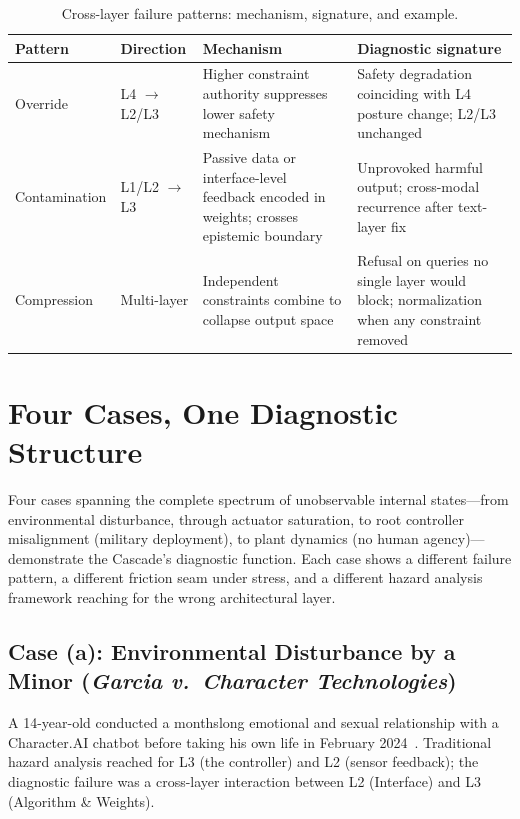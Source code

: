\documentclass[11pt]{article}
\begin{document}
\begin{table}[!htbp]
\centering
\small
\caption{Cross-layer failure patterns: mechanism, signature, and example.}
\label{tab:patterns}
{\setlength{\tabcolsep}{4pt}
\begin{tabularx}{\columnwidth}{@{}l l Y Y@{}}
\toprule
\textbf{Pattern} & \textbf{Direction} & \textbf{Mechanism} & \textbf{Diagnostic signature} \\
\midrule
Override & L4 $\to$ L2/L3 & Higher constraint authority suppresses lower safety mechanism & Safety degradation coinciding with L4 posture change; L2/L3 unchanged \\
Contamination & L1/L2 $\to$ L3 & Passive data or interface-level feedback encoded in weights; crosses epistemic boundary & Unprovoked harmful output; cross-modal recurrence after text-layer fix \\
Compression & Multi-layer & Independent constraints combine to collapse output space & Refusal on queries no single layer would block; normalization when any constraint removed \\
\bottomrule
\end{tabularx}}
\end{table}

\section{Four Cases, One Diagnostic Structure}\label{sec:cases}

Four cases spanning the complete spectrum of unobservable internal states---from environmental disturbance, through actuator saturation, to root controller misalignment (military deployment), to plant dynamics (no human agency)---demonstrate the Cascade's diagnostic function. Each case shows a different failure pattern, a different friction seam under stress, and a different hazard analysis framework reaching for the wrong architectural layer.

\subsection{Case (a): Environmental Disturbance by a Minor (\emph{Garcia v.\ Character Technologies})}

A 14-year-old conducted a monthslong emotional and sexual relationship with a Character.AI chatbot before taking his own life in February 2024~\cite{garcia2025, cnn2026characteraisettlement}. Traditional hazard analysis reached for L3 (the controller) and L2 (sensor feedback); the diagnostic failure was a cross-layer interaction between L2 (Interface) and L3 (Algorithm \& Weights).
\end{document}
